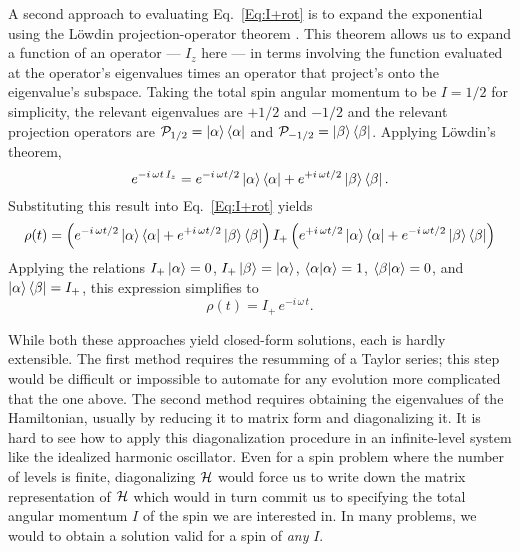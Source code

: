  A second approach to evaluating Eq.~\ref{Eq:I+rot} is to expand the exponential using the L\"{o}wdin projection-operator theorem \cite{Lowdin1955mar}.  This theorem allows us to expand a function of an operator --- $I_z$ here --- in terms involving the function evaluated at the operator's eigenvalues times an operator that project's onto the eigenvalue's subspace.  Taking the total spin angular momentum to be $I = 1/2$ for simplicity, the relevant eigenvalues are $+1/2$ and $-1/2$ and the relevant projection operators are ${\cal P}_{1/2} = \ket{\alpha}\bra{\alpha}$ and ${\cal P}_{-1/2} = \ket{\beta}\bra{\beta}$.  Applying L\"{o}wdin's theorem,
\begin{equation}
e^{-i \, \omega t \, I_z} 
	= e^{-i \, \omega t / 2} \ket{\alpha}\bra{\alpha}
	+ e^{+i \, \omega t / 2} \ket{\beta}\bra{\beta}.
\end{equation}
Substituting this result into Eq.~\ref{Eq:I+rot} yields
\[
\rho(t) = \left( e^{-i \, \omega t / 2} \ket{\alpha}\bra{\alpha}
	+ e^{+i \, \omega t / 2} \ket{\beta}\bra{\beta} \right)
	I_{+} \left( e^{+i \, \omega t / 2} \ket{\alpha}\bra{\alpha}
	+ e^{-i \, \omega t / 2} \ket{\beta}\bra{\beta} \right)
\]
Applying the relations $I_{+} \ket{\alpha} = 0$, $I_{+} \ket{\beta} = \ket{\alpha}$, $\braket{\alpha|\alpha} = 1$, $\braket{\beta|\alpha} = 0$, and $\ket{\alpha} \bra{\beta} = I_{+}$, this expression simplifies to
\begin{equation}
\rho(t) 
	= I_{+} \, e^{-i \, \omega \, t}.
	\label{Eq:I+-soln-method-2}
\end{equation} 

While both these approaches yield closed-form solutions, each is hardly extensible.  The first method requires the resumming of a Taylor series; this step would be difficult or impossible to automate for any evolution more complicated that the one above.  The second method requires obtaining the eigenvalues of the Hamiltonian, usually by reducing it to matrix form and diagonalizing it.  It is hard to see how to apply this diagonalization procedure in an infinite-level system like the idealized harmonic oscillator. Even for a spin problem where the number of levels is finite, diagonalizing ${\cal H}$ would force us to write down the matrix representation of ${\cal H}$ which would in turn commit us to specifying the total angular momentum $I$ of the spin we are interested in.  In many problems, we would to obtain a solution valid for a spin of \emph{any} $I$.  

